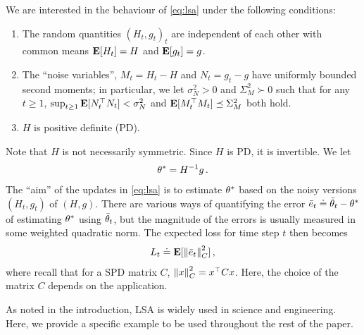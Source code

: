 We are interested in the behaviour of \eqref{eq:lsa} under the following conditions:
\begin{assumption}\label{genlsa}
\mbox{}
\vspace*{-0.14in}

\begin{enumerate}
\item\label{mart} 
The random quantities $(H_t,g_t)_t$  are independent of each other with common means $\mathbf{E}[ H_t] = H$ and $\mathbf{E}[g_t] = g$.

\item \label{noise} The ``noise variables'', $M_t = H_t - H$ and $N_t = g_t - g$ have uniformly bounded second moments;
in particular, we let $\sigma_N^2>0$ and $\Sigma_M^2\succ 0$ such that for any $t\ge 1$,
$\sup_{t\ge 1} \mathbf{E}[N_t^\top N_t]<\sigma_N^2$ and
$\mathbf{E}[M_t^\top M_t]\preceq \Sigma_M^2$ both hold.

\item \label{mat} $H$ is positive definite (PD). %
\end{enumerate}
\end{assumption}
Note that $H$ is not necessarily symmetric.
Since $H$ is PD, it is invertible. We let
\begin{align*}
\theta^* = H^{-1} g\,.
\end{align*}
The ``aim'' of the updates in \eqref{eq:lsa} is to estimate $\theta^*$ based on the noisy versions $(H_t,g_t)$ of $(H,g)$.
There are various ways of quantifying the error $\bar{e}_t \doteq \bar{\theta}_t - \theta^*$ of estimating $\theta^*$ using $\bar{\theta}_t$, but the magnitude
of the errors is usually measured in some weighted quadratic norm. The expected loss for time step $t$ then becomes
\begin{align*}
L_t \doteq \mathbf{E}[ \left\| \bar{e}_t\right\|_{C}^2 ]\,,
\end{align*}
where recall that for a SPD matrix $C$, $\left\| x\right\|_C^2 = x^\top C x$.
Here, the choice of the matrix $C$ depends on the application.


As noted in the introduction, LSA is widely used in science and engineering. Here, we provide a specific example to be used throughout the rest of the paper.

